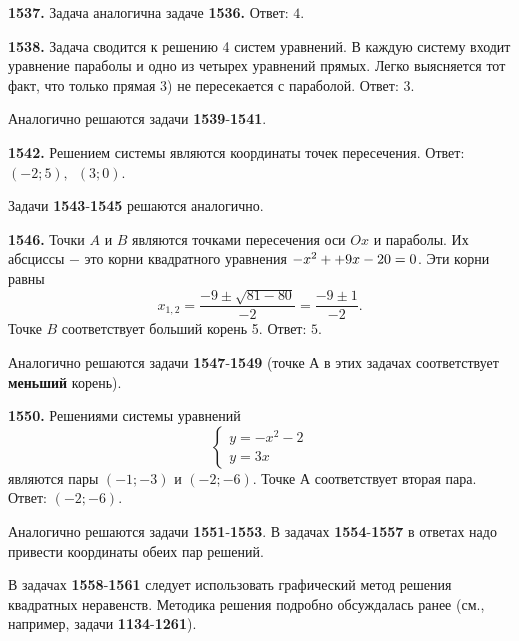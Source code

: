 \textbf{1537.}  Задача аналогична задаче \textbf{1536.} \newline \null \hspace*{\fill} Ответ: $4$.

\textbf{1538.} Задача сводится к  решению 4 систем уравнений. В каждую систему входит уравнение параболы и одно из четырех уравнений прямых. Легко выясняется тот факт, что только прямая 3) не пересекается с параболой. \newline \null \hspace*{\fill} Ответ: $3$.

Аналогично решаются задачи  \textbf{1539}-\textbf{1541}.

\textbf{1542.}  Решением системы являются координаты точек пересечения. \newline \null \hspace*{\fill} Ответ: $(-2;5),\enspace (3;0)$.

Задачи  \textbf{1543}-\textbf{1545} решаются аналогично.

\newpage \textbf{1546.} Точки $A$ и $B$ являются точками пересечения оси $Ox$ и параболы. Их абсциссы $-$ это корни квадратного уравнения $-x^2+\linebreak+9x-20=0$. Эти корни равны  $$x_{1,2}=\frac{-9\pm\sqrt{81-80}}{-2}=\frac{-9\pm1}{-2}.$$ Точке $B$ соответствует больший корень 5. \newline \null \hspace*{\fill} Ответ: $5$.

Аналогично решаются задачи \textbf{1547}-\textbf{1549} (точке $А$ в этих задачах соответствует \textbf{меньший} корень).

\textbf{1550.} Решениями системы уравнений $$\begin{cases}
	y=-x^2-2
	\\
	y=3x	
  \end{cases}$$ являются пары  $(-1;-3)$ и $(-2;-6)$. Точке $А$ соответствует вторая пара. \newline \null \hspace*{\fill} Ответ: $(-2;-6)$.

Аналогично решаются задачи \textbf{1551}-\textbf{1553}. В задачах \textbf{1554}-\textbf{1557} в ответах надо привести координаты обеих пар решений.

В задачах \textbf{1558}-\textbf{1561} следует использовать графический метод  решения квадратных неравенств.  Методика решения  подробно обсуждалась ранее  (см., например,  задачи \textbf{1134}-\textbf{1261}). 

